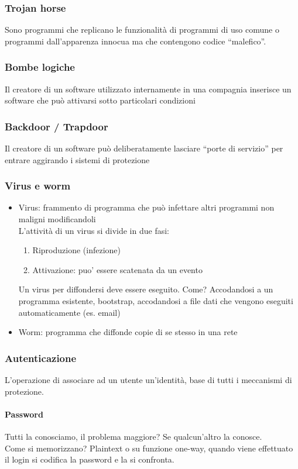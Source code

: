 \documentclass[a4paper,12pt]{article}
\begin{document}
\subsubsection{Trojan horse}
Sono programmi che replicano le funzionalità di programmi di
uso comune o programmi dall’apparenza innocua ma che
contengono codice “malefico”.
\subsubsection{Bombe logiche}
Il creatore di un software utilizzato internamente in una
compagnia inserisce un software che può attivarsi sotto
particolari condizioni
\subsubsection{Backdoor / Trapdoor}
Il creatore di un software può deliberatamente lasciare “porte di
servizio” per entrare aggirando i sistemi di protezione
\subsubsection{Virus e worm}
\begin{itemize}
  \item Virus: frammento di programma che può infettare altri programmi non maligni modificandoli\\
    L'attività di un virus si divide in due fasi:
    \begin{enumerate}
      \item Riproduzione (infezione)
      \item Attivazione: puo' essere scatenata da un evento
    \end{enumerate}  
    Un virus per diffondersi deve essere eseguito. Come? Accodandosi a un programma esistente, bootstrap, accodandosi a file dati che vengono eseguiti automaticamente (es. email)
  \item Worm: programma che diffonde copie di se stesso in una rete
\end{itemize}
\subsubsection{Autenticazione}
L'operazione di associare ad un utente un'identità, base di tutti i meccanismi di protezione.
\paragraph{Password} Tutti la conosciamo, il problema maggiore? Se qualcun'altro la conosce.\\
Come si memorizzano? Plaintext o su funzione one-way, quando viene effettuato il login si codifica la password e la si confronta.\\
\end{document}
